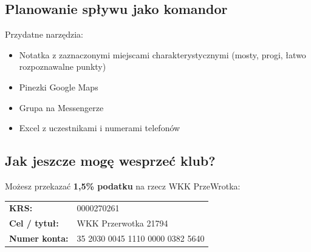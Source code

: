 \subsection*{Planowanie spływu jako komandor}

Przydatne narzędzia:

\begin{itemize}[leftmargin=1.5em, itemsep=2pt]
  \item Notatka z zaznaczonymi miejscami charakterystycznymi (mosty, progi, łatwo
    rozpoznawalne punkty)
  \item Pinezki Google Maps
  \item Grupa na Messengerze
  \item Excel z uczestnikami i numerami telefonów
\end{itemize}

\subsection*{Jak jeszcze mogę wesprzeć klub?}

Możesz przekazać \textbf{1{,}5\% podatku} na rzecz WKK PrzeWrotka:

\begin{center}
  \begin{tabular}{ll}
    \textbf{KRS:}              & 0000270261 \\
    \textbf{Cel / tytuł:}      & WKK Przerwotka 21794 \\
    \textbf{Numer konta:}      & 35 2030 0045 1110 0000 0382 5640 \\
  \end{tabular}
\end{center}